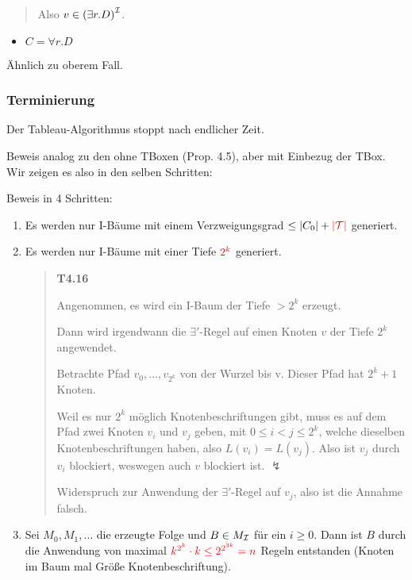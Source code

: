 \begin{quote}
Also $v \in \left( \exists r.D \right)^\MI$.
\end{quote}

\begin{itemize}
\item
  $C = \forall r.D$
\end{itemize}

Ähnlich zu oberem Fall.

\subsubsection{Terminierung}\label{terminierung}

\begin{proposition}
Der Tableau-Algorithmus stoppt nach endlicher Zeit.
\end{proposition}

Beweis analog zu den ohne TBoxen (Prop. 4.5), aber mit Einbezug der TBox. Wir zeigen es also in den selben Schritten:

Beweis in 4 Schritten:

\begin{enumerate}
\def\labelenumi{\arabic{enumi}.}
\item
  Es werden nur I-Bäume mit einem Verzweigungsgrad $\leq \left| C_{0} \right| + \color{red} \left| \MT \right|$ generiert.
\item
  Es werden nur I-Bäume mit einer Tiefe $\color{red} 2^k$ generiert.
  \begin{quote}
  \textbf{T4.16}

  Angenommen, es wird ein I-Baum der Tiefe $> 2^k$ erzeugt.

  Dann wird irgendwann die $\exists '$-Regel auf einen Knoten $v$ der Tiefe $2^k$ angewendet.

  Betrachte Pfad $v_0, \ldots , v_{2^k}$ von der Wurzel bis v. Dieser Pfad hat $2^k+1$ Knoten.

  Weil es nur $2^k$ möglich Knotenbeschriftungen gibt, muss es auf dem Pfad zwei Knoten $v_i$ und $v_j$ geben, mit $0 \leq i < j \leq 2^k$, welche dieselben Knotenbeschriftungen haben, also $L(v_i) = L(v_j)$. Also ist $v_j$ durch $v_i$ blockiert, weswegen auch $v$ blockiert ist. $\lightning$

  Widerspruch zur Anwendung der $\exists '$-Regel auf $v_j$, also ist die Annahme falsch.
  \end{quote}
\item
  Sei $M_{0},M_1,\ldots$ die erzeugte Folge und $B \in M_{\mathcal{I}}$ für
  ein $i \geq 0$. Dann ist $B$ durch die Anwendung von maximal
  $\color{red} k^{2^{k}} \cdot k \leq 2^{2^{3k}}= n$ Regeln entstanden (Knoten im Baum mal Größe Knotenbeschriftung).
\end{enumerate}

